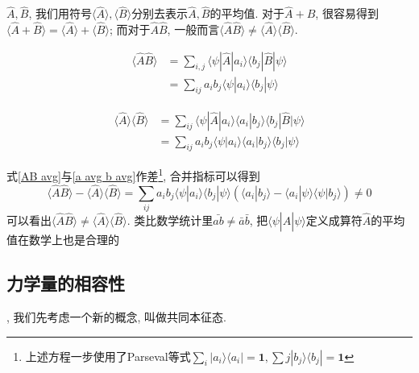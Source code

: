 \documentclass[a4paper,11pt]{book}
\begin{document}
$\hat{A},\hat{B}$, 我们用符号$\langle\hat{A}\rangle,\langle\hat{B}\rangle$分别去表示$\hat{A},\hat{B}$的平均值. 对于$\hat{A}+\hat{B}$, 很容易得到$\langle\hat{A}+\hat{B}\rangle=\langle\hat{A}\rangle+\langle\hat{B}\rangle$; 而对于$\hat{A}\hat{B}$, 一般而言$\langle\hat{A}\hat{B}\rangle\neq\langle\hat{A}\rangle\langle\hat{B}\rangle$. \\
\begin{minipage}[b]{0.5\linewidth}
\begin{equation}\label{AB avg}
  \begin{split}
     \langle\hat{A}\hat{B}\rangle&=\sum_{i,j}\langle\psi|\hat{A}|a_i\rangle\langle b_j|\hat{B}|\psi\rangle\\
       &=\sum_{ij}a_ib_j\langle\psi|a_i\rangle\langle b_j|\psi\rangle
  \end{split}
\end{equation}
\end{minipage}
\begin{minipage}[b]{0.5\linewidth}
\begin{equation}\label{a avg b avg}
  \begin{split}
     \langle\hat{A}\rangle\langle\hat{B}\rangle&=\sum_{ij}\langle\psi|\hat{A}|a_i\rangle\langle a_i|b_j\rangle\langle b_j|\hat{B}|\psi\rangle\\
       &=\sum_{ij}a_ib_j\langle\psi|a_i\rangle\langle a_i|b_j\rangle\langle b_j|\psi\rangle
  \end{split}
\end{equation}
\end{minipage}
式\eqref{AB avg}与\eqref{a avg b avg}作差\footnote{上述方程一步使用了Parseval等式$\sum_{i}|a_i\rangle\langle a_i|=\mathbf{1},\sum{j}|b_j\rangle\langle b_j|=\mathbf{1}$}, 合并指标可以得到
\begin{equation*}
  \langle\hat{A}\hat{B}\rangle-\langle\hat{A}\rangle\langle\hat{B}\rangle=\sum_{ij}a_ib_j\langle\psi|a_i\rangle\langle b_j|\psi\rangle(\langle a_i|b_j\rangle-\langle a_i|\psi\rangle\langle\psi|b_j\rangle)\neq0
\end{equation*}
可以看出$\langle\hat{A}\hat{B}\rangle\neq\langle\hat{A}\rangle\langle\hat{B}\rangle$. 类比数学统计里$\bar{ab}\neq\bar{a}\bar{b}$, 把$\langle\psi|\hat{A}|\psi\rangle$定义成算符$\hat{A}$的平均值在数学上也是合理的
\subsection{力学量的相容性}
, 我们先考虑一个新的概念, 叫做共同本征态.
\end{document}
